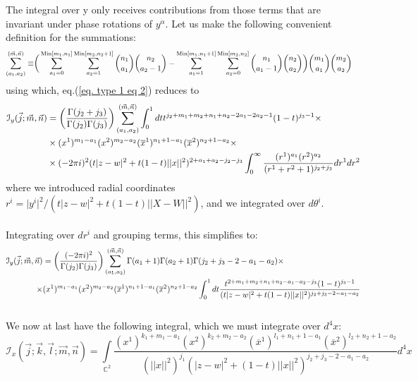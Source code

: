 \documentclass[a4paper,11pt]{article}
\begin{document}
The integral over y only receives contributions from those terms that are invariant under phase rotations of $y^{\dot{\alpha}}$. Let us make the following convenient definition
for the summations:
\begingroup \allowdisplaybreaks \begin{align}
    \sum_{(a_1,a_2)}^{(\vec{m},\vec{n})} \equiv &\bigg( \sum_{a_1=0}^{\text{Min}[m_1,n_1]} \sum_{a_2=1}^{\text{Min}[m_2,n_2+1]} {n_1 \choose a_1}  {n_2 \choose a_2-1}-\sum_{a_1=1}^{\text{Min}[m_1,n_1+1]} \sum_{a_2=0}^{\text{Min}[m_2,n_2]} {n_1 \choose a_1-1}  {n_2 \choose a_2}\bigg) {m_1 \choose a_1} {m_2 \choose a_2} \notag
\end{align} \endgroup
using which, eq.(\ref{eq. type 1 eq 2}) reduces to
\begingroup \allowdisplaybreaks \begin{align}
\mathcal{I}_y (\vec{j};\vec{m}, \vec{n}) &= \bigg( \frac{\Gamma(j_2+j_3)}{\Gamma(j_2) \Gamma(j_3)} \bigg) \sum_{(a_1,a_2)}^{(\vec{m},\vec{n})} \int_0^1 dt t^{j_2+m_1+m_2+n_1+n_2-2a_1-2a_2-1} (1-t)^{j_3-1}  \times \\
    &\times (x^1)^{m_1-a_1}(x^2)^{m_2-a_2} (\overline{x}^1)^{n_1+1-a_1}(\overline{x}^2)^{n_2+1-a_2} \times \notag\\
    & \times (-2 \pi i)^2 (t\vert z-w \vert^2+t(1-t) \vert \vert x \vert \vert^2)^{2+a_1+a_2-j_2-j_3} \int_0^{\infty} \frac{(r^1)^{a_1} (r^2)^{a_2} }{(r^1+r^2+1)^{j_2+j_3}} dr^1 dr^2 \notag
\end{align} \endgroup
where we introduced radial coordinates $r^i = \vert y^i \vert^2/(t\vert z-w\vert^2+t(1-t)\vert \vert X-W \vert \vert^2)$, and we integrated over $d\theta^i$. \\ \\
Integrating over $dr^i$ and grouping terms, this simplifies to:
\begingroup \allowdisplaybreaks \begin{align}
\mathcal{I}_y (\vec{j};\vec{m}, \vec{n}) &= \bigg( \frac{(-2\pi i)^2}{\Gamma(j_2) \Gamma(j_3)} \bigg) \sum_{(a_1,a_2)}^{(\vec{m},\vec{n})} \Gamma(a_1+1) \Gamma(a_2+1) \Gamma(j_2+j_3-2-a_1-a_2) \times \notag \\
\times& (x^1)^{m_1-a_1} (x^2)^{m_2-a_2} (\overline{x}^1)^{n_1+1-a_1} (\overline{x}^2)^{n_2+1-a_2} \int_0^1 dt \frac{t^{2+m_1+m_2+n_1+n_2-a_1-a_2-j_3} (1-t)^{j_3-1}}{(t\vert z-w \vert^2+t(1-t) \vert \vert x \vert \vert^2)^{j_2+j_3-2-a_1-a_2}} \notag
\end{align} \endgroup
\\ 
We now at last have the following integral, which we must integrate over $d^4x$:
\begin{equation}
    \mathcal{I}_x (\vec{j};\vec{k},\vec{l};\vec{m}, \vec{n}) = \underset{\mathbb{C}^2}{\int} \frac{ (x^1)^{k_1+m_1-a_1} (x^2)^{k_2+m_2-a_2} (\overline{x}^1)^{l_1+n_1+1-a_1} (\overline{x}^2)^{l_2+n_2+1-a_2}}{(\vert \vert x \vert \vert^2)^{j_1} (\vert z-w \vert^2+(1-t) \vert \vert x \vert \vert^2)^{j_2+j_3-2-a_1-a_2}} d^4x
\end{equation}
\end{document}
